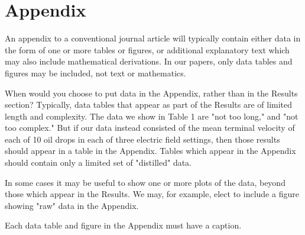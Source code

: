 \section*{Appendix}

An appendix to a conventional journal article will typically contain either data in the form of one or more tables or figures, or additional explanatory text which may also include mathematical derivations. In our papers, only data tables and figures may be included, not text or mathematics.

When would you choose to put data in the Appendix, rather than in the Results section? Typically, data tables that appear as part of the Results are of limited length and complexity. The data we show in Table 1 are "not too long," and "not too complex." But if our data instead consisted of the mean terminal velocity of each of 10 oil drops in each of three electric field settings, then those results should appear in a table in the Appendix. Tables which appear in the Appendix should contain only a limited set of "distilled" data.

In some cases it may be useful to show one or more plots of the data, beyond those which appear in the Results. We may, for example, elect to include a figure showing "raw" data in the Appendix.

Each data table and figure in the Appendix must have a caption.